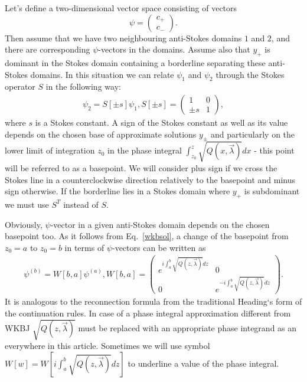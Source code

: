 \documentclass[aps,prl,preprint,superscriptaddress]{revtex4}
\begin{document}
Let's define a two-dimensional vector space consisting of vectors
\[
\psi= \begin{pmatrix} c_+ \\ c_- \end{pmatrix}.
\]
Then assume that we have two neighbouring anti-Stokes domains $1$ and $2$, and there are corresponding $\psi$-vectors in the domains. Assume also that $y_+$ is dominant in the Stokes domain containing a borderline separating these anti-Stokes domains. In this situation we can relate $\psi_1$ and $\psi_2$ through the Stokes operator $S$ in the following way:
\begin{eqnarray}
\psi_2 = S[\pm s] \psi_1, S[\pm s] =  \begin{pmatrix} 1 & 0 \\ \pm s & 1 \end{pmatrix},    
\label{S}
\end{eqnarray}
where $s$ is a Stokes constant. A sign of the Stokes constant as well as its value depends on the chosen base of approximate solutions $y_\pm$ and particularly on the lower limit of integration $z_0$ in the phase integral $\int_{z_0}^z \sqrt{Q(x,\vec \lambda)} dx$ - this point will be referred to as a basepoint. We will consider plus sign if we cross the Stokes line in a counterclockwise direction relatively to the basepoint and minus sign otherwise. If the borderline lies in a Stokes domain where $y_+$ is subdominant we must use $S^T$ instead of $S$.

Obviously, $\psi$-vector in a given anti-Stokes domain depends on the chosen basepoint too. As it follows from Eq.~\ref{wkbsol}, a change of the basepoint from $z_0=a$ to $z_0=b$ in terms of $\psi$-vectors can be written as
\begin{eqnarray}
\psi^{(b)} = W[b,a] \psi^{(a)}, 
W[b,a] =  
\begin{pmatrix} e^{i \int_a^b \sqrt{Q(z,\vec{\lambda})} dz} & 0 \\ 0 & e^{-i \int_a^b \sqrt{Q(z,\vec{\lambda})} dz} \end{pmatrix}.    \label{W}
\end{eqnarray}
It is analogous to the reconnection formula from the traditional Heading`s form of the continuation rules. In case of a phase integral approximation different from WKBJ $\sqrt{Q(z,\vec{\lambda})}$ must be replaced with an appropriate phase integrand as an everywhere in this article. Sometimes we will use symbol $W[w]=W[i \int_a^b \sqrt{Q(z,\vec{\lambda})} dz]$ to underline a value of the phase integral. 
\end{document}
